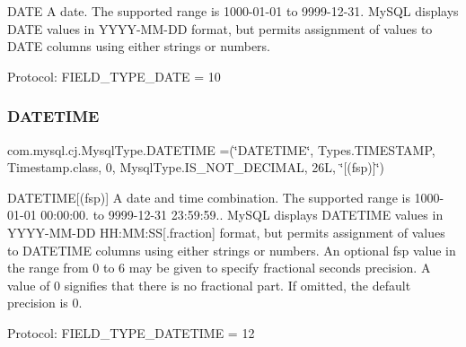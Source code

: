 D\+A\+TE A date. The supported range is \textquotesingle{}1000-\/01-\/01\textquotesingle{} to \textquotesingle{}9999-\/12-\/31\textquotesingle{}. My\+S\+QL displays D\+A\+TE values in \textquotesingle{}Y\+Y\+Y\+Y-\/\+M\+M-\/\+DD\textquotesingle{} format, but permits assignment of values to D\+A\+TE columns using either strings or numbers.

Protocol\+: F\+I\+E\+L\+D\+\_\+\+T\+Y\+P\+E\+\_\+\+D\+A\+TE = 10 \mbox{\label{enumcom_1_1mysql_1_1cj_1_1_mysql_type_a10ab4319f5464017da0b6c5d8ba57840}} 
\subsubsection{\texorpdfstring{D\+A\+T\+E\+T\+I\+ME}{DATETIME}}
{\footnotesize\ttfamily com.\+mysql.\+cj.\+Mysql\+Type.\+D\+A\+T\+E\+T\+I\+ME =(\char`\"{}D\+A\+T\+E\+T\+I\+ME\char`\"{}, Types.\+T\+I\+M\+E\+S\+T\+A\+MP, Timestamp.\+class, 0, Mysql\+Type.\+I\+S\+\_\+\+N\+O\+T\+\_\+\+D\+E\+C\+I\+M\+AL, 26\+L, \char`\"{}\mbox{[}(fsp)\mbox{]}\char`\"{})}

D\+A\+T\+E\+T\+I\+ME\mbox{[}(fsp)\mbox{]} A date and time combination. The supported range is \textquotesingle{}1000-\/01-\/01 00\+:00\+:00.\textquotesingle{} to \textquotesingle{}9999-\/12-\/31 23\+:59\+:59.\textquotesingle{}. My\+S\+QL displays D\+A\+T\+E\+T\+I\+ME values in \textquotesingle{}Y\+Y\+Y\+Y-\/\+M\+M-\/\+DD H\+H\+:\+MM\+:SS\mbox{[}.fraction\mbox{]}\textquotesingle{} format, but permits assignment of values to D\+A\+T\+E\+T\+I\+ME columns using either strings or numbers. An optional fsp value in the range from 0 to 6 may be given to specify fractional seconds precision. A value of 0 signifies that there is no fractional part. If omitted, the default precision is 0.

Protocol\+: F\+I\+E\+L\+D\+\_\+\+T\+Y\+P\+E\+\_\+\+D\+A\+T\+E\+T\+I\+ME = 12 \mbox{\label{enumcom_1_1mysql_1_1cj_1_1_mysql_type_a90f5401b1fa7f31d2d384156fa552e2c}} 
